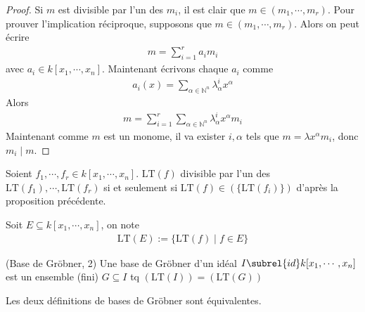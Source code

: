         \begin{proof}
            Si $m$ est divisible par l'un des $m_i$, il est clair que $m \in (m_1, \cdots, m_r)$. Pour prouver l'implication réciproque, supposons que $m \in (m_1, \cdots, m_r)$. Alors on peut écrire
            \begin{align*}
                m = \sum_{i = 1}^r a_i m_i
            \end{align*}
            avec $a_i \in k[x_1, \cdots, x_n]$. Maintenant écrivons chaque $a_i$ comme
            \begin{align*}
                a_i(x) = \sum_{\alpha \in \mathbb{N}^n} \lambda_\alpha^i x^{\alpha}
            \end{align*}
            Alors
            \begin{align*}
                m = \sum_{i = 1}^r \sum_{\alpha \in \mathbb{N}^n} \lambda_\alpha^i x^{\alpha} m_i
            \end{align*}
            Maintenant comme $m$ est un monome, il va exister $i, \alpha$ tels que $m = \lambda x^\alpha m_i$, donc $m_i \mid m$.
        \end{proof}
        Soient $f_1, \cdots, f_r \in k[x_1, \cdots, x_n]$. $\mathrm{LT}(f)$ divisible par l'un des $\mathrm{LT}(f_1), \cdots, \mathrm{LT}(f_r)$ si et seulement si $\mathrm{LT}(f) \in (\{\mathrm{LT}(f_i)\})$ d'après la proposition précédente. \\
        \begin{nota}
            Soit $E \subseteq k[x_1, \cdots, x_n]$, on note
            \begin{align*}
                \mathrm{LT}(E) := \{\mathrm{LT}(f) \mid f \in E\}
            \end{align*}
        \end{nota}
        \begin{defi} (Base de Gröbner, 2)
            Une base de Gröbner d'un idéal $I \subrel{id} k[x_1, \cdots, x_n]$ est un ensemble (fini) $G \subseteq I$ tq $(\mathrm{LT}(I)) = (\mathrm{LT}(G))$
        \end{defi}
        \begin{theo}
            Les deux définitions de bases de Gröbner sont équivalentes.
        \end{theo}
